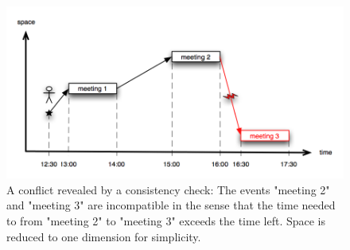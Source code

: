 \begin{figure}[h!]
	\centering
	\includegraphics[width=15cm]{pics/consistency_check.png}
	\caption{A conflict revealed by a consistency check: The events "meeting 2" and "meeting 3" are incompatible in the sense that the time needed to from "meeting 2" to "meeting 3" exceeds the time left. Space is reduced to one dimension for simplicity.}
	\label{fig:consistency_check}
\end{figure}









